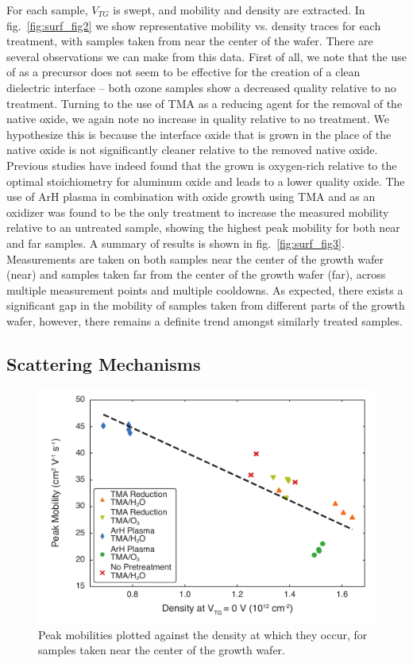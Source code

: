 For each sample, $V_{TG}$ is swept, and mobility and density are extracted. In fig.~\ref{fig:surf_fig2} we show representative mobility vs. density traces for each treatment, with samples taken from near the center of the wafer. There are several observations we can make from this data. First of all, we note that the use of  as a precursor does not seem to be effective for the creation of a clean dielectric interface -- both ozone samples show a decreased quality relative to no treatment. Turning to the use of TMA as a reducing agent for the removal of the native oxide, we again note no increase in quality relative to no treatment. We hypothesize this is because the interface oxide that is grown in the place of the native oxide is not significantly cleaner relative to the removed native oxide. Previous studies have indeed found that the  grown is oxygen-rich relative to the optimal stoichiometry for aluminum oxide and leads to a lower quality oxide\cite{ingaas_redux,10.1021/cm0608903}. The use of ArH plasma in combination with oxide growth using TMA and  as an oxidizer was found to be the only treatment to increase the measured mobility relative to an untreated sample, showing the highest peak mobility for both near and far samples. A summary of results is shown in fig.~\ref{fig:surf_fig3}. Measurements are taken on both samples near the center of the growth wafer (near) and samples taken far from the center of the growth wafer (far), across multiple measurement points and multiple cooldowns. As expected, there exists a significant gap in the mobility of samples taken from different parts of the growth wafer, however, there remains a definite trend amongst similarly treated samples.

\subsection{\label{sec:surf_scat}Scattering Mechanisms}

\begin{figure}
    \includegraphics[width=0.6\linewidth]{Figure4}
    \caption[Peak mobilities against density]{\label{fig:surf_fig4}Peak mobilities plotted against the density at which they occur, for samples taken near the center of the growth wafer.}
\end{figure}

